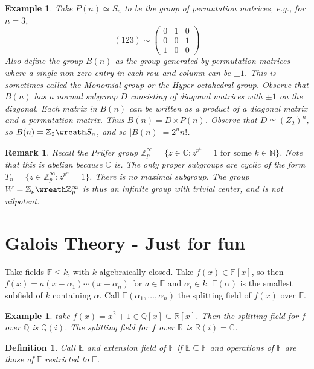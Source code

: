 \documentclass[a4paper,10pt]{article}
\newcommand{\CC}{\mathbb{C}}
\newcommand{\RR}{\mathbb{R}}
\newcommand{\NN}{\mathbb{N}}
\newcommand{\QQ}{\mathbb{Q}}
\newcommand{\ZZ}{\mathbb{Z}}
\newcommand{\EE}{\mathbb{E}}
\newcommand{\FF}{\mathbb{F}}
\newtheorem{Def}[thm]{Definition}
\newtheorem{eg}[thm]{Example}
\newtheorem{rem}[thm]{Remark}
\begin{document}
\begin{eg}
Take $P(n) \simeq S_n$ to be the group of permutation matrices, e.g., for $n = 3$, 
\[ (123) \sim \begin{pmatrix} 0 & 1 & 0 \\ 0 & 0 & 1 \\ 1 & 0 & 0 \end{pmatrix} \]
Also define the group $B(n)$ as the group generated by permutation matrices where a single non-zero entry in each row and column can be $\pm 1$. This is sometimes called the Monomial group or the Hyper octahedral group. Observe that $B(n)$ has a normal subgroup $D$ consisting of diagonal matrices with $\pm 1$ on the diagonal. Each matrix in $B(n)$ can be written as a product of a diagonal matrix and a permutation matrix. Thus $B(n) = D \rtimes P(n)$. Observe that $D \simeq (Z_2 )^n$, so $B(n) = \ZZ_2 \wreath S_n$, and so $|B(n)| = 2^n n!$.
\end{eg}

\begin{rem}
Recall the Pr\"{u}fer group $\ZZ_p^\infty = \{ z \in \CC : z^{p^k} = 1 \text{ for some } k \in \NN \}$. Note that this is abelian because $\CC$ is. The only proper subgroups are cyclic of the form $T_n = \{ z \in \ZZ_p^\infty : z^{p^n} = 1 \}$. There is no maximal subgroup. The group $W = \ZZ_p \wreath \ZZ_p^\infty$ is thus an infinite group with trivial center, and is not nilpotent. 
\end{rem}


\newpage
\section{Galois Theory - Just for fun}

Take fields $\FF \leq k$, with $k$ algebraically closed. Take $f(x) \in \FF[x]$, so then $f(x) = a (x - \alpha_1) \cdots (x - \alpha_n)$ for $a \in \FF$ and $\alpha_i \in k$. $\FF (\alpha)$ is the smallest subfield of $k$ containing $\alpha$. Call $\FF( \alpha_1, \dots, \alpha_n)$ the splitting field of $f(x)$ over $\FF$. 

\begin{eg}
take $f(x) = x^2 + 1 \in \QQ[x] \subseteq \RR[x]$. Then the splitting field for $f$ over $\QQ$ is $\QQ(i)$. The splitting field for $f$ over $\RR$ is $\RR(i) = \CC$. 
\end{eg}

\begin{Def}
Call $\EE$ and extension field of $\FF$ if $\EE \subseteq \FF$ and operations of $\FF$ are those of $\EE$ restricted to $\FF$. 
\end{Def}
\end{document}
